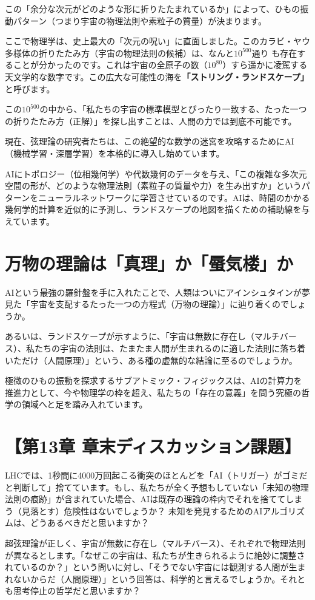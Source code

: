 この「余分な次元がどのような形に折りたたまれているか」によって、ひもの振動パターン（つまり宇宙の物理法則や素粒子の質量）が決まります。

ここで物理学は、史上最大の「次元の呪い」に直面しました。このカラビ・ヤウ多様体の折りたたみ方（宇宙の物理法則の候補）は、なんと\(10^{500}\)通り も存在することが分かったのです。これは宇宙の全原子の数（\(10^{80}\)）すら遥かに凌駕する天文学的な数字です。この広大な可能性の海を\textbf{「ストリング・ランドスケープ」}と呼びます。

この\(10^{500}\)の中から、「私たちの宇宙の標準模型とぴったり一致する、たった一つの折りたたみ方（正解）」を探し出すことは、人間の力では到底不可能です。

現在、弦理論の研究者たちは、この絶望的な数学の迷宮を攻略するためにAI（機械学習・深層学習）を本格的に導入し始めています。

AIにトポロジー（位相幾何学）や代数幾何のデータを与え、「この複雑な多次元空間の形が、どのような物理法則（素粒子の質量や力）を生み出すか」というパターンをニューラルネットワークに学習させているのです。AIは、時間のかかる幾何学的計算を近似的に予測し、ランドスケープの地図を描くための補助線を与えています。

\section{万物の理論は「真理」か「蜃気楼」か}

AIという最強の羅針盤を手に入れたことで、人類はついにアインシュタインが夢見た「宇宙を支配するたった一つの方程式（万物の理論）」に辿り着くのでしょうか。

あるいは、ランドスケープが示すように、「宇宙は無数に存在し（マルチバース）、私たちの宇宙の法則は、たまたま人間が生まれるのに適した法則に落ち着いただけ（人間原理）」という、ある種の虚無的な結論に至るのでしょうか。

極微のひもの振動を探求するサブアトミック・フィジックスは、AIの計算力を推進力として、今や物理学の枠を超え、私たちの「存在の意義」を問う究極の哲学の領域へと足を踏み入れています。

\section*{【第13章 章末ディスカッション課題】}

LHCでは、1秒間に4000万回起こる衝突のほとんどを「AI（トリガー）がゴミだと判断して」捨てています。もし、私たちが全く予想もしていない「未知の物理法則の痕跡」が含まれていた場合、AIは既存の理論の枠内でそれを捨ててしまう（見落とす）危険性はないでしょうか？ 未知を発見するためのAIアルゴリズムは、どうあるべきだと思いますか？

超弦理論が正しく、宇宙が無数に存在し（マルチバース）、それぞれで物理法則が異なるとします。「なぜこの宇宙は、私たちが生きられるように絶妙に調整されているのか？」という問いに対し、「そうでない宇宙には観測する人間が生まれないからだ（人間原理）」という回答は、科学的と言えるでしょうか。それとも思考停止の哲学だと思いますか？




